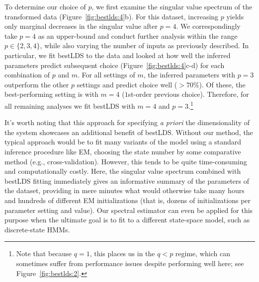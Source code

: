 To determine our choice of $p$, we first examine the singular value spectrum of the transformed data (Figure~\ref{fig:bestlds:4}b). For this dataset, increasing $p$ yields only marginal decreases in the singular value after $p=4$. We correspondingly take $p=4$ as an upper-bound and conduct further analysis within the range $p \in \{2, 3, 4\}$, while also varying the number of inputs as previously described. In particular, we fit bestLDS to the data and looked at how well the inferred parameters predict subsequent choice (Figure~\ref{fig:bestlds:4}c-d) for each combination of $p$ and $m$. For all settings of $m$, the inferred parameters with $p=3$ outperform the other $p$ settings and predict choice well ($> 70\%$). Of these, the best-performing setting is with $m=4$ ($1$st-order previous choice). Therefore, for all remaining analyses we fit bestLDS with $m=4$ and $p=3$.\footnote{Note that because $q=1$, this places us in the $q<p$ regime, which can sometimes suffer from  performance issues despite performing well here; see Figure~\ref{fig:bestlds:2}.} 

It's worth noting that this approach for specifying \textit{a priori} the dimensionality of the system showcases an additional benefit of bestLDS. Without our method, the typical approach would be to fit many variants of the model using a standard inference procedure like EM, choosing the state number by some comparative method (e.g., cross-validation). However, this tends to be quite time-consuming and computationally costly. Here, the singular value spectrum combined with bestLDS fitting immediately gives an informative summary of the parameters of the dataset, providing in mere minutes what would otherwise take many hours and hundreds of different EM initializations (that is, dozens of initializations per parameter setting and value). Our spectral estimator can even be applied for this purpose when the ultimate goal is to fit to a different state-space model, such as discrete-state HMMs. 


